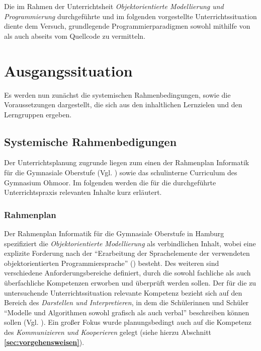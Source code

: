 \documentclass[paper=a4, DIV=13, BCOR=12mm, twoside=on, onecolumn=on, open = any, titlepage =on, parskip =half-, headsepline = on, footsepline = on, chapterprefix = on, sectionprefix = on, appendixprefix = off, fontsize = 11pt, numbers = noenddot, abstract = off]{scrreprt}
\begin{document}
Die im Rahmen der Unterrichtsheit \emph{Objektorientierte Modellierung und Programmierung} durchgeführte und im folgenden vorgestellte Unterrichtssituation diente dem Versuch, grundlegende Programmierparadigmen sowohl mithilfe von als auch abseits vom Quellcode zu vermitteln.


\newpage
\par\singlespacing
\chapter{Ausgangssituation}
\onehalfspacing
Es werden nun zunächst die systemischen Rahmenbedingungen, sowie die Voraussetzungen dargestellt, die sich aus den inhaltlichen Lernzielen und den Lerngruppen ergeben.
\par\singlespacing
\section{Systemische Rahmenbedigungen}
\onehalfspacing
Der Unterrichtsplanung zugrunde liegen zum einen der Rahmenplan Informatik für die Gymnasiale Oberstufe (Vgl. \cite{oberstufe:09}) sowie das schulinterne Curriculum des Gymnasium Ohmoor. Im folgenden werden die für die durchgeführte Unterrichtspraxis relevanten Inhalte kurz erläutert.
\par\singlespacing
\subsection{Rahmenplan}
\onehalfspacing
Der Rahmenplan Informatik für die Gymnasiale Oberstufe in Hamburg spezifiziert die \textit{Objektorientierte Modellierung} als verbindlichen Inhalt, wobei eine explizite Forderung nach der "`Erarbeitung der Sprachelemente der verwendeten objektorientierten Programmiersprache"' (\cite[S. 17]{oberstufe:09}) besteht. Des weiteren sind verschiedene Anforderungsbereiche definiert, durch die sowohl fachliche als auch überfachliche Kompetenzen erworben und überprüft werden sollen. Der für die zu untersuchende Unterrichtssituation relevante Kompetenz bezieht sich auf den Bereich des \textit{Darstellen und Interpretieren}, in dem die Schülerinnen und Schüler "`Modelle und Algorithmen sowohl grafisch als auch verbal"' beschreiben können sollen (Vgl. \cite[S.16]{oberstufe:09}). Ein großer Fokus wurde planungsbedingt auch auf die Kompetenz des \textit{Kommunizieren und Kooperieren} gelegt (siehe hierzu Abschnitt \textbf{\ref{sec:vorgehensweisen}}).

\par \singlespacing
\end{document}
